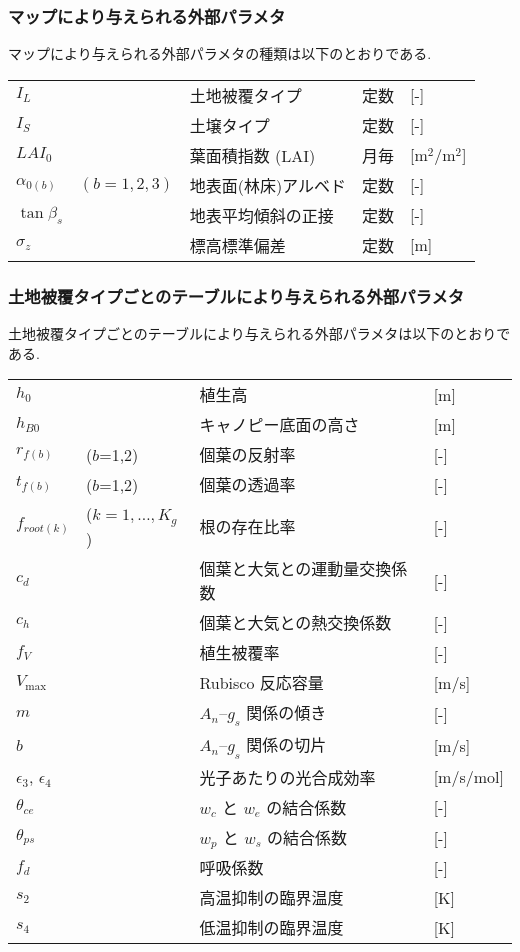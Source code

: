 \subsubsection{マップにより与えられる外部パラメタ}

マップにより与えられる外部パラメタの種類は以下のとおりである.

\begin{tabular}{lllll}
 $I_L$ & & 土地被覆タイプ   & 定数 & [-] \\
 $I_S$ & & 土壌タイプ       & 定数 & [-] \\
 $LAI_0$ & & 葉面積指数 (LAI) & 月毎 & [m$^2$/m$^2$] \\
 $\alpha_{0(b)}$ & $(b=1,2,3)$ & 地表面(林床)アルベド & 定数 & [-] \\
 $\tan\beta_{s}$ & & 地表平均傾斜の正接 & 定数 & [-] \\
 $\sigma_z$ & & 標高標準偏差 & 定数 & [m]
\end{tabular}

\subsubsection{土地被覆タイプごとのテーブルにより与えられる外部パラメタ}

土地被覆タイプごとのテーブルにより与えられる外部パラメタは以下のとおりで
ある.

\begin{tabular}{llll}
$h_0$ & & 植生高 & [m] \\
$h_{B0}$ & & キャノピー底面の高さ & [m] \\
$r_{f(b)}$ & ($b$=1,2) & 個葉の反射率 & [-] \\
$t_{f(b)}$ & ($b$=1,2) & 個葉の透過率 & [-] \\
$f_{root(k)}$ & ($k=1,\ldots,K_g$) & 根の存在比率 & [-] \\
$c_d$ & & 個葉と大気との運動量交換係数 & [-] \\
$c_h$ & & 個葉と大気との熱交換係数 & [-] \\
$f_V$ & & 植生被覆率 & [-] \\
$V_{\max}$ & & Rubisco 反応容量 & [m/s] \\
$m$ & & $A_n$--$g_s$ 関係の傾き & [-] \\
$b$ & & $A_n$--$g_s$ 関係の切片 & [m/s] \\
$\epsilon_3$, $\epsilon_4$ & & 光子あたりの光合成効率 & [m/s/mol] \\
$\theta_{ce}$ & & $w_c$ と $w_e$ の結合係数 & [-] \\
$\theta_{ps}$ & & $w_p$ と $w_s$ の結合係数 & [-] \\
$f_d$ & & 呼吸係数 & [-] \\
$s_2$ & & 高温抑制の臨界温度 & [K] \\
$s_4$ & & 低温抑制の臨界温度 & [K]
\end{tabular}

